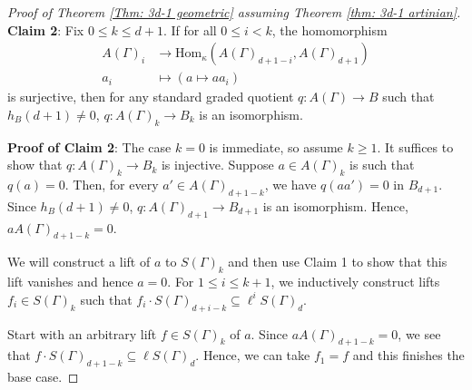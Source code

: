 \documentclass[11pt]{amsart}
\theoremstyle{definition}
\newcommand{\sg}{S(\Gamma)}
\newcommand{\ag}{A(\Gamma)}
\newcommand{\ka}{\kappa}
\newcommand{\Ag}{A(\Gamma)}
\newcommand{\ggo}{g_{\Gamma_1}}
\newcommand{\go}{\Gamma_1}
\newcommand{\sgo}{S(\Gamma_1)}
\newcommand{\Res}{\text{Res}}
\begin{document}
\begin{proof}[Proof of Theorem \ref{Thm: 3d-1 geometric} assuming Theorem \ref{thm: 3d-1 artinian}]




\noindent\textbf{Claim 2}:
Fix $0\leq k\leq d+1$. If for all $0 \leq i <k$, the homomorphism
\begin{align*}
    \Ag_i &\to \text{Hom}_\ka(\Ag_{d+1-i}, \Ag_{d+1})\\
    a_i & \mapsto (a \mapsto aa_i)
\end{align*}
is surjective, then for any standard graded quotient $q: \ag \to B$ such that $h_B(d+1) \neq 0$, $q:\Ag_k \to B_k$ is an isomorphism.

\noindent\textbf{Proof of Claim 2}:
The case $k=0$ is immediate, so assume $k\geq1$.
It suffices to show that $q:\Ag_k \to B_k$ is injective. Suppose $a \in \Ag_k$ is such that $q(a)=0$. Then, for every $a' \in \Ag_{d+1-k}$, we have $q(a a')=0$ in $B_{d+1}$. Since $h_B(d+1) \neq 0$, $q: A(\Gamma)_{d+1} \to B_{d+1}$ is an isomorphism. Hence, $a\Ag_{d+1-k}=0$. 

We will construct a lift of $a$ to $S(\Gamma)_k$ and then use Claim 1 to show that this lift vanishes and hence $a=0$.
For $1 \leq i \leq k+1$, we inductively construct lifts $f_i \in \sg_k$ such that $f_i \cdot\sg_{d+i-k} \subseteq \ell^i \sg_d$.

Start with an arbitrary lift $f \in \sg_k$ of $a$. Since $a\Ag_{d+1-k}=0$, we see that $f \cdot \sg_{d+1-k} \subseteq \ell\sg_d$. Hence, we can take $f_1=f$ and this finishes the base case.


\end{proof}
\end{document}
